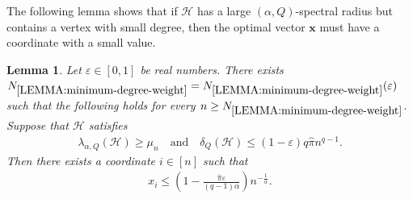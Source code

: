 \documentclass[11pt,a4paper]{article}
\newtheorem{lemma}[definition]{Lemma}
\begin{document}
The following lemma shows that if $\mathcal{H}$ has a large $(\alpha, Q)$-spectral radius but contains a vertex with small degree, then the optimal vector $\mathbf{x}$ must have a coordinate with a small value.
%
\begin{lemma}\label{LEMMA:minimum-degree-weight}
    Let $\varepsilon \in [0,1]$ be real numbers. 
    There exists $N_{\ref{LEMMA:minimum-degree-weight}} = N_{\ref{LEMMA:minimum-degree-weight}}(\varepsilon)$ such that the following holds for every $n \ge N_{\ref{LEMMA:minimum-degree-weight}}$. 
    Suppose that $\mathcal{H}$ satisfies 
    \begin{align*}
        \lambda_{\alpha, Q}(\mathcal{H})\ge \mu_n
        \quad\text{and}\quad 
        \delta_{Q}(\mathcal{H})
        \le (1-\varepsilon) q \hat{\pi}  n^{q-1}. 
    \end{align*}
    Then there exists a coordinate $i \in [n]$ such that 
    \begin{align*}
        x_{i} 
        \le \left( 1-\frac{\hat{\pi} \varepsilon}{(q-1)\alpha} \right) n^{-\frac{1}{\alpha}}. 
    \end{align*}
\end{lemma}
\end{document}
